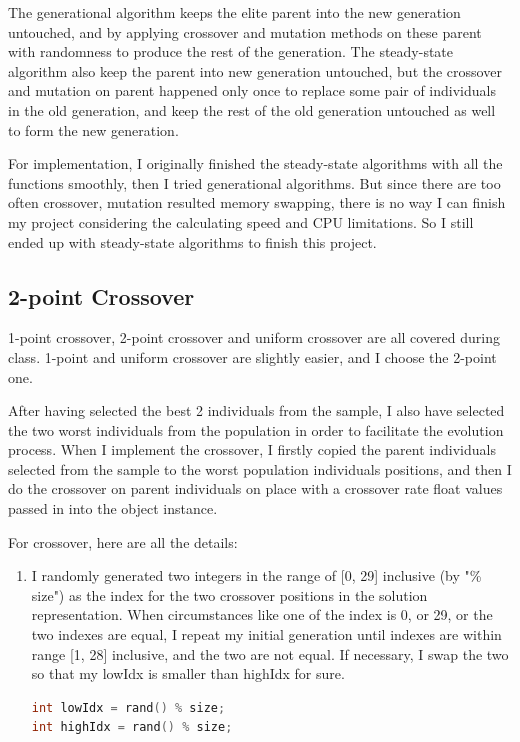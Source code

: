 \documentclass[b5paper,11pt, abstraction, titlepage]{scrartcl}
\begin{document}
\begin{CJK}{UTF8}{gbsn}
The generational algorithm keeps the elite parent into the new generation untouched, and by applying crossover and mutation methods on these parent with randomness to produce the rest of the generation. The steady-state algorithm also keep the parent into new generation untouched, but the crossover and mutation on parent happened only once to replace some pair of individuals in the old generation, and keep the rest of the old generation untouched as well to form the new generation.

For implementation, I originally finished the steady-state algorithms with all the functions smoothly, then I tried generational algorithms. But since there are too often crossover, mutation resulted memory swapping, there is no way I can finish my project considering the calculating speed and CPU limitations. So I still ended up with steady-state algorithms to finish this project.

\subsection{2-point Crossover}
1-point crossover, 2-point crossover and uniform crossover are all covered during class. 1-point and uniform crossover are slightly easier, and I choose the 2-point one.

After having selected the best 2 individuals from the sample, I also have selected the two worst individuals from the population in order to facilitate the evolution process. When I implement the crossover, I firstly copied the parent individuals selected from the sample to the worst population individuals positions, and then I do the crossover on parent individuals on place with a crossover rate float values passed in into the object instance.

For crossover, here are all the details:
\begin{enumerate}
  \itemsep=-3pt
\item I randomly generated two integers in the range of [0, 29] inclusive (by "\% size") as the index for the two crossover positions in the solution representation. When circumstances like one of the index is 0, or 29, or the two indexes are equal, I repeat my initial generation until indexes are within range [1, 28] inclusive, and the two are not equal. If necessary, I swap the two so that my lowIdx is smaller than highIdx for sure.
\begin{lstlisting}[language=c++]
int lowIdx = rand() % size;
int highIdx = rand() % size;
    

\end{lstlisting}
\end{enumerate}
\end{CJK}
\end{document}
